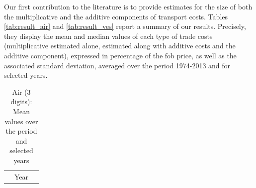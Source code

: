 \documentclass[a4paper,11pt]{article}
\begin{document}
Our first contribution to the literature is to provide estimates for the size of both the multiplicative and the additive components of transport costs. Tables \ref{tab:result_air} and \ref{tab:result_ves} report a summary of our results. Precisely, they display the mean and median values of each type of trade costs (multiplicative estimated alone, estimated along with additive costs and the additive component), expressed in percentage of the fob price, as well as the associated standard deviation, averaged over the period 1974-2013 and for selected years.

\begin{table}[htbp]
  \centering
  \caption{Air (3 digits): Mean values over the period and selected years}
\begin{center}
    \begin{tabular}{lccccccc}

   \hline\hline
          & \multicolumn{6}{c}{Year}                      &  \\


\end{tabular}
\end{center}
\end{table}
\end{document}

